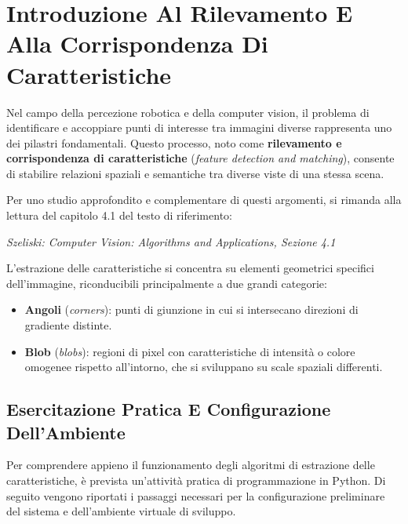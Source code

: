 ﻿\documentclass[11pt, a4paper]{article}
\author{Francesco Lo Verde}
\begin{document}
\section{Introduzione Al Rilevamento E Alla Corrispondenza Di Caratteristiche}

Nel campo della percezione robotica e della computer vision, il problema di identificare e accoppiare punti di interesse tra immagini diverse rappresenta uno dei pilastri fondamentali. Questo processo, noto come \textbf{rilevamento e corrispondenza di caratteristiche} (\emph{feature detection and matching}), consente di stabilire relazioni spaziali e semantiche tra diverse viste di una stessa scena.


Per uno studio approfondito e complementare di questi argomenti, si rimanda alla lettura del capitolo 4.1 del testo di riferimento:
\begin{center}
    \emph{Szeliski: Computer Vision: Algorithms and Applications, Sezione 4.1}
\end{center}

L'estrazione delle caratteristiche si concentra su elementi geometrici specifici dell'immagine, riconducibili principalmente a due grandi categorie:
\begin{itemize}[noitemsep]
    \item \textbf{Angoli} (\emph{corners}): punti di giunzione in cui si intersecano direzioni di gradiente distinte.
    \item \textbf{Blob} (\emph{blobs}): regioni di pixel con caratteristiche di intensità o colore omogenee rispetto all'intorno, che si sviluppano su scale spaziali differenti.
\end{itemize}


\subsection{Esercitazione Pratica E Configurazione Dell'Ambiente}

Per comprendere appieno il funzionamento degli algoritmi di estrazione delle caratteristiche, è prevista un'attività pratica di programmazione in Python. Di seguito vengono riportati i passaggi necessari per la configurazione preliminare del sistema e dell'ambiente virtuale di sviluppo.
\end{document}
